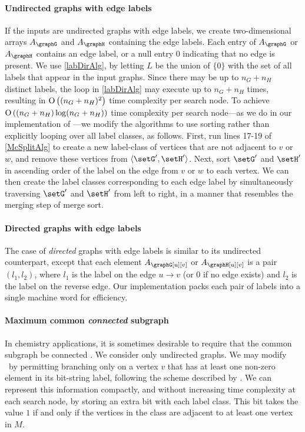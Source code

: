 \paragraph{Undirected graphs with edge labels} If the inputs are
undirected graphs with edge labels, we create two-dimensional
arrays $A_\graphG$ and $A_\graphH$ containing the edge labels.
Each entry of $A_\graphG$ or $A_\graphH$ contains an
edge label, or a null entry $0$ indicating that no edge is present.  We use \cref{labDirAlg}, by
letting $L$ be the union of $\{0\}$ with the set of all labels that appear in
the input graphs. Since there may be up to $n_G + n_H$ distinct labels, the loop in
\cref{labDirAlg} may execute up to $n_G + n_H$ times, resulting in $\operatorname{O}\left((n_G+n_H)^2\right)$
time complexity per search node.  To achieve $\operatorname{O}\left((n_G+n_H) \log (n_G+n_H)\right)$ time
complexity per search node---as we do in our implementation of \McSplit---we
modify the algorithms to use sorting rather
than explicitly looping over all label classes, as follows.  First, run lines
17-19 of \cref{McSplitAlg} to create a new label-class of vertices that are
not adjacent to $v$ or $w$, and remove these vertices from $\langle \setG',\setH'
\rangle$.  Next, sort $\setG'$ and $\setH'$ in ascending order of the label on the edge
from $v$ or $w$ to each vertex. We can then create the label classes
corresponding to each edge label by simultaneously traversing $\setG'$ and $\setH'$
from left to right, in a manner that resembles the merging step of merge sort.

\paragraph{Directed graphs with edge labels} The case
of \emph{directed} graphs with edge labels is similar to its undirected
counterpart, except that each element $A_\graphG[u][v]$ or $A_\graphH[u][v]$ is a
pair $(l_1, l_2)$, where $l_1$ is the label on the edge $u \rightarrow v$ (or 0
if no edge exists) and $l_2$ is the label on the reverse edge.
Our implementation packs each pair of labels into a single machine word for efficiency.

\paragraph{Maximum common \emph{connected} subgraph} In chemistry applications,
it is sometimes desirable to require that the common subgraph be connected
\citep{Ehrlich:2011}. We consider only undirected graphs. We may modify \McSplit\ by
permitting branching only on a vertex $v$ that has at least one non-zero
element in its bit-string label, following the scheme described by
\citet{DBLP:conf/mco/VismaraV08}.  We can represent this information compactly,
and without increasing time complexity at each search node, by storing an extra
bit with each label class.  This bit takes the value $1$ if and only if the
vertices in the class are adjacent to at least one vertex in $M$.

